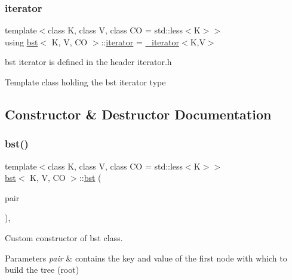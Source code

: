 \subsubsection{\texorpdfstring{iterator}{iterator}}
{\footnotesize\ttfamily template$<$class K, class V, class CO = std\+::less$<$\+K$>$$>$ \\
using \hyperlink{classbst}{bst}$<$ K, V, CO $>$\+::\hyperlink{classbst_a9378fa7f3f48ee62f3a0b4d168d8d98b}{iterator} =  \hyperlink{classbst_1_1__iterator}{\+\_\+iterator}$<$K,V$>$}



bst iterator is defined in the header iterator.\+h 

Template class holding the bst iterator type 

\subsection{Constructor \& Destructor Documentation}
\mbox{\label{classbst_a9283be063cf6c8b7c8a8cc84bd0e1313}} 
\subsubsection{\texorpdfstring{bst()}{bst()}\hspace{0.1cm}{\footnotesize\ttfamily [1/4]}}
{\footnotesize\ttfamily template$<$class K, class V, class CO = std\+::less$<$\+K$>$$>$ \\
\hyperlink{classbst}{bst}$<$ K, V, CO $>$\+::\hyperlink{classbst}{bst} (\begin{DoxyParamCaption}\item[{const pair\+\_\+type \&}]{pair }\end{DoxyParamCaption})\hspace{0.3cm}{\ttfamily [inline]}, {\ttfamily [explicit]}}



Custom constructor of bst class. 


\begin{DoxyParams}{Parameters}
{\em pair} & contains the key and value of the first node with which to build the tree (root) \\
\hline
\end{DoxyParams}
\mbox{\label{classbst_a2280fc615e6b89c866e4e9c853274956}} 
